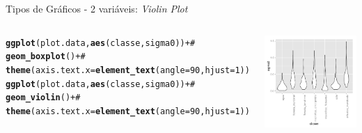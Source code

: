 \documentclass{beamer}\usepackage[]{graphicx}\usepackage[]{color}
\makeatletter
\newcommand{\hlnum}[1]{\textcolor[rgb]{0.686,0.059,0.569}{#1}}%
\newcommand{\hlcom}[1]{\textcolor[rgb]{0.678,0.584,0.686}{\textit{#1}}}%
\newcommand{\hlopt}[1]{\textcolor[rgb]{0,0,0}{#1}}%
\newcommand{\hlstd}[1]{\textcolor[rgb]{0.345,0.345,0.345}{#1}}%
\newcommand{\hlkwc}[1]{\textcolor[rgb]{0.333,0.667,0.333}{#1}}%
\newcommand{\hlkwd}[1]{\textcolor[rgb]{0.737,0.353,0.396}{\textbf{#1}}}%
\newenvironment{kframe}{%
 \def\at@end@of@kframe{}%
 \ifinner\ifhmode%
  \def\at@end@of@kframe{\end{minipage}}%
  \begin{minipage}{\columnwidth}%
 \fi\fi%
 \def\FrameCommand##1{\hskip\@totalleftmargin \hskip-\fboxsep
 \colorbox{shadecolor}{##1}\hskip-\fboxsep
     \hskip-\linewidth \hskip-\@totalleftmargin \hskip\columnwidth}%
 \MakeFramed {\advance\hsize-\width
   \@totalleftmargin\z@ \linewidth\hsize
   \@setminipage}}%
 {\par\unskip\endMakeFramed%
 \at@end@of@kframe}
\newenvironment{knitrout}{}{} %
\renewenvironment{knitrout}{\setlength{\topsep}{0mm}}{}
\makeatother
\begin{document}
\begin{frame}[fragile]{Tipos de Gráficos - 2 variáveis: \emph{Violin Plot}}

\begin{columns}[t]


\begin{knitrout}\tiny
{}\color{fgcolor}\begin{kframe}
\begin{alltt}
\hlkwd{ggplot}\hlstd{(plot.data,}\hlkwd{aes}\hlstd{(classe,sigma0))} \hlopt{+}\hlcom{#}
  \hlkwd{geom_boxplot}\hlstd{()} \hlopt{+}\hlcom{#}
  \hlkwd{theme}\hlstd{(}\hlkwc{axis.text.x} \hlstd{=} \hlkwd{element_text}\hlstd{(}\hlkwc{angle} \hlstd{=} \hlnum{90}\hlstd{,} \hlkwc{hjust} \hlstd{=} \hlnum{1}\hlstd{))}
\hlkwd{ggplot}\hlstd{(plot.data,}\hlkwd{aes}\hlstd{(classe,sigma0))} \hlopt{+}\hlcom{#}
  \hlkwd{geom_violin}\hlstd{()} \hlopt{+}\hlcom{#}
  \hlkwd{theme}\hlstd{(}\hlkwc{axis.text.x} \hlstd{=} \hlkwd{element_text}\hlstd{(}\hlkwc{angle} \hlstd{=} \hlnum{90}\hlstd{,} \hlkwc{hjust} \hlstd{=} \hlnum{1}\hlstd{))}
\end{alltt}
\end{kframe}
\end{knitrout}


\begin{knitrout}
\color{fgcolor}
\includegraphics[width=1\linewidth]{figure/unnamed-chunk-77-1} 

\end{knitrout}

\end{columns}

\end{frame}
\end{document}
